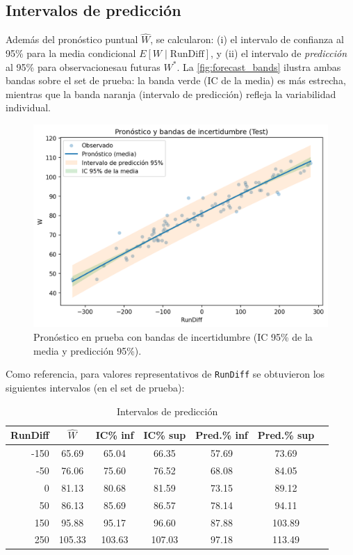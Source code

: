 \documentclass[man,floatsintext]{apa7}
\begin{document}
\subsection{Intervalos de predicción}
Además del pronóstico puntual \(\hat{W}\), se calcularon:
(i) el intervalo de confianza al 95\% para la media condicional \(E[W \mid \text{RunDiff}]\), y
(ii) el intervalo de \emph{predicción} al 95\% para observacionesau futuras \(W^\ast\).
La \autoref{fig:forecast_bands} ilustra ambas bandas sobre el set de prueba: la banda verde (IC de la media) es más estrecha, mientras que la banda naranja (intervalo de predicción) refleja la variabilidad individual.

\begin{figure}[H]
    \centering
    \includegraphics[width=.85\linewidth]{../plots/forecast_intervals_vs_rundiff_test.png}
    \caption{Pronóstico en prueba con bandas de incertidumbre (IC 95\% de la media y predicción 95\%).}
    \label{fig:forecast_bands}
\end{figure}

Como referencia, para valores representativos de \texttt{RunDiff} se obtuvieron los siguientes intervalos (en el set de prueba):

\begin{table}[H]
    \centering
    \caption{Intervalos de predicción}
    \label{tab:pred_intervals}
    \begin{tabular}{rcccccc}
      \toprule
      RunDiff & $\hat{W}$ & IC\;95\% inf & IC\;95\% sup & Pred.\;95\% inf & Pred.\;95\% sup \\
      \midrule
      -150 & 65.69 & 65.04 & 66.35 & 57.69 & 73.69 \\
       -50 & 76.06 & 75.60 & 76.52 & 68.08 & 84.05 \\
         0 & 81.13 & 80.68 & 81.59 & 73.15 & 89.12 \\
        50 & 86.13 & 85.69 & 86.57 & 78.14 & 94.11 \\
       150 & 95.88 & 95.17 & 96.60 & 87.88 & 103.89 \\
       250 & 105.33 & 103.63 & 107.03 & 97.18 & 113.49 \\
      \bottomrule
    \end{tabular}
  \end{table}
  
\end{document}

